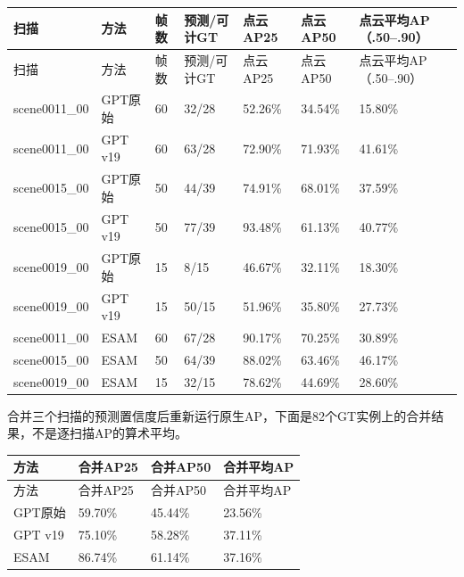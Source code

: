 \documentclass[UTF8,fontset=fandol]{ctexart}
\begin{document}
{\small
\begin{longtable}{|p{}|p{}|p{}|p{}|p{}|p{}|p{}|}
\hline
扫描 & 方法 & 帧数 & 预测/可计GT & 点云AP25 & 点云AP50 & 点云平均AP（.50–.90） \\ \hline
\endfirsthead
\hline
扫描 & 方法 & 帧数 & 预测/可计GT & 点云AP25 & 点云AP50 & 点云平均AP（.50–.90） \\ \hline
\endhead
scene0011\_00 & GPT原始 & 60 & 32/28 & 52.26\% & 34.54\% & 15.80\% \\ \hline
scene0011\_00 & GPT v19 & 60 & 63/28 & 72.90\% & 71.93\% & 41.61\% \\ \hline
scene0015\_00 & GPT原始 & 50 & 44/39 & 74.91\% & 68.01\% & 37.59\% \\ \hline
scene0015\_00 & GPT v19 & 50 & 77/39 & 93.48\% & 61.13\% & 40.77\% \\ \hline
scene0019\_00 & GPT原始 & 15 & 8/15 & 46.67\% & 32.11\% & 18.30\% \\ \hline
scene0019\_00 & GPT v19 & 15 & 50/15 & 51.96\% & 35.80\% & 27.73\% \\ \hline
scene0011\_00 & ESAM & 60 & 67/28 & 90.17\% & 70.25\% & 30.89\% \\ \hline
scene0015\_00 & ESAM & 50 & 64/39 & 88.02\% & 63.46\% & 46.17\% \\ \hline
scene0019\_00 & ESAM & 15 & 32/15 & 78.62\% & 44.69\% & 28.60\% \\ \hline
\end{longtable}
}

合并三个扫描的预测置信度后重新运行原生AP，下面是82个GT实例上的合并结果，不是逐扫描AP的算术平均。



{\small
\begin{longtable}{|p{}|p{}|p{}|p{}|}
\hline
方法 & 合并AP25 & 合并AP50 & 合并平均AP \\ \hline
\endfirsthead
\hline
方法 & 合并AP25 & 合并AP50 & 合并平均AP \\ \hline
\endhead
GPT原始 & 59.70\% & 45.44\% & 23.56\% \\ \hline
GPT v19 & 75.10\% & 58.28\% & 37.11\% \\ \hline
ESAM & 86.74\% & 61.14\% & 37.16\% \\ \hline
\end{longtable}
}
\end{document}
